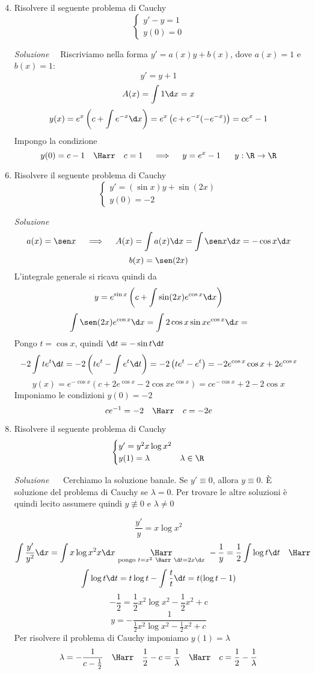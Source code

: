 \documentclass{article}
\begin{document}
\begin{enumerate}[label=\textbf{Esercizio 13.\arabic*.},itemindent=*]
\setcounter{enumi}{3}
\item Risolvere il seguente problema di Cauchy
\[\begin{cases}
    y'-y=1\\
    y(0)=0
\end{cases}\]
\item[\textit{\large Soluzione~}]~Riscriviamo nella forma $y'=a(x)y+b(x)$, dove $a(x)=1$ e $b(x)=1$:
\[y'=y+1\]
\[A(x)=\int1\d x=x\]
\[y(x)=e^x\left( c+\int e^{-x}\d x \right)=e^{x}\left( c+e^{-x}(-e^{-x}) \right)=ce^x-1\]
Impongo la condizione 
\[y(0)=c-1~~~\Harr~~~c=1~~~\implies ~~~y=e^{x}-1~~~~~y:\R\to\R\]
\item Risolvere il seguente problema di Cauchy
\[\begin{cases}
    y'=\left( \sin x \right)y+\sin(2x)\\
    y(0)=-2
\end{cases}\]
\item[\textit{\large Soluzione~}]~ 
\[a(x)=\sen x~~~\implies~~~A(x)=\int a(x)\d x=\int \sen x \d x=-\cos x \d x\]
\[b(x)=\sen (2x)\]
L'integrale generale si ricava quindi da 
\[y=e^{\sin x}\left( c+\int \sin (2x) e^{\cos x} \d x \right)\]
\[\int \sen(2x)e^{\cos x}\d x=\int 2\cos x \sin x e^{\cos x}\d x=\]
Pongo $t=\cos x$, quindi $\d t=-\sin t \d t$
\[-2\int te^t\d t=-2\left( te^t-\int e^t\d t \right)=-2\left(te^t-e^t\right)=-2e^{\cos x}\cos x+2e^{\cos x}\]
\[y(x)=e^{-\cos x}\left( c+2e^{\cos x}-2\cos xe^{\cos x} \right)=ce^{-\cos x}+2-2\cos x\]
Imponiamo le condizioni $y(0)=-2$
\[ce^{-1}=-2~~~\Harr~~~c=-2e\]
\item Risolvere il seguente problema di Cauchy
\[\begin{cases}
    y'=y^2x\log x^2\\
    y(1)=\lambda&\lambda \in \R
\end{cases}\]
\item[\textit{\large Soluzione~}]~
Cerchiamo la soluzione banale. Se $y'\equiv 0$, allora $y\equiv 0$. È soluzione del problema di Cauchy se $\lambda=0$.
Per trovare le altre soluzioni è quindi lecito assumere quindi $y\not\equiv 0$ e $\lambda \neq 0$

\[\frac{y'}{y}=x\log x^2\]
\[\int \frac{y'}{y^2}\d x=\int x\log x^2 x \d x~\underset{\text{pongo } t=x^2~\Rarr~\d t=2x\d x}{\Harr}~-\frac{1}{y}=\frac{1}{2}\int \log t \d t ~~~\Harr\]
\[\int \log t\d t =t \log t-\int \frac{t}{t}\d t=t(\log t-1)\]
\[-\frac{1}{2}={\frac{1}{2}x^2\log x^2-\frac{1}{2}x^2+c}\]
\[y=-\frac{1}{\frac{1}{2}x^2\log x^2-\frac{1}{2}x^2+c}\]
Per risolvere il problema di Cauchy imponiamo $y(1)=\lambda$
\[\lambda =-\frac{1}{c-\frac{1}{2}}~~~\Harr~~~\frac{1}{2}-c=\frac{1}{\lambda}~~~\Harr~~~c=\frac{1}{2}-\frac{1}{\lambda}\]
\end{enumerate}
\end{document}
